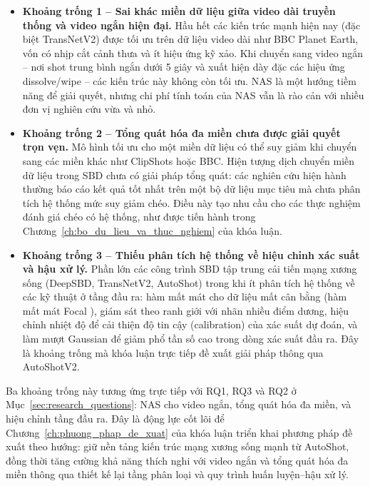 \begin{itemize}
    \item \textbf{Khoảng trống 1 -- Sai khác miền dữ liệu giữa video dài truyền thống và video ngắn hiện đại.} Hầu hết các kiến trúc mạnh hiện nay (đặc biệt TransNetV2) được tối ưu trên dữ liệu video dài như BBC Planet Earth, vốn có nhịp cắt cảnh thưa và ít hiệu ứng kỹ xảo. Khi chuyển sang video ngắn -- nơi shot trung bình ngắn dưới 5 giây và xuất hiện dày đặc các hiệu ứng dissolve/wipe -- các kiến trúc này không còn tối ưu. NAS là một hướng tiềm năng để giải quyết, nhưng chi phí tính toán của NAS vẫn là rào cản với nhiều đơn vị nghiên cứu vừa và nhỏ.
 
    \item \textbf{Khoảng trống 2 -- Tổng quát hóa đa miền chưa được giải quyết trọn vẹn.} Mô hình tối ưu cho một miền dữ liệu có thể suy giảm khi chuyển sang các miền khác như ClipShots hoặc BBC. Hiện tượng dịch chuyển miền dữ liệu trong SBD chưa có giải pháp tổng quát: các nghiên cứu hiện hành thường báo cáo kết quả tốt nhất trên một bộ dữ liệu mục tiêu mà chưa phân tích hệ thống mức suy giảm chéo. Điều này tạo nhu cầu cho các thực nghiệm đánh giá chéo có hệ thống, như được tiến hành trong Chương~\ref{ch:bo_du_lieu_va_thuc_nghiem} của khóa luận.
 
    \item \textbf{Khoảng trống 3 -- Thiếu phân tích hệ thống về hiệu chỉnh xác suất và hậu xử lý.} Phần lớn các công trình SBD tập trung cải tiến mạng xương sống (DeepSBD, TransNetV2, AutoShot) trong khi ít phân tích hệ thống về các kỹ thuật ở tầng đầu ra: hàm mất mát cho dữ liệu mất cân bằng (hàm mất mát Focal \cite{Lin2017FocalLoss}), giám sát theo ranh giới với nhãn nhiều điểm dương, hiệu chỉnh nhiệt độ \cite{Guo2017Calibration} để cải thiện độ tin cậy (calibration) của xác suất dự đoán, và làm mượt Gaussian để giảm phổ tần số cao trong dòng xác suất đầu ra. Đây là khoảng trống mà khóa luận trực tiếp đề xuất giải pháp thông qua AutoShotV2.
\end{itemize}
 
\noindent
Ba khoảng trống này tương ứng trực tiếp với RQ1, RQ3 và RQ2 ở Mục~\ref{sec:research_questions}: NAS cho video ngắn, tổng quát hóa đa miền, và hiệu chỉnh tầng đầu ra. Đây là động lực cốt lõi để Chương~\ref{ch:phuong_phap_de_xuat} của khóa luận triển khai phương pháp đề xuất theo hướng: giữ nền tảng kiến trúc mạng xương sống mạnh từ AutoShot, đồng thời tăng cường khả năng thích nghi với video ngắn và tổng quát hóa đa miền thông qua thiết kế lại tầng phân loại và quy trình huấn luyện--hậu xử lý.

